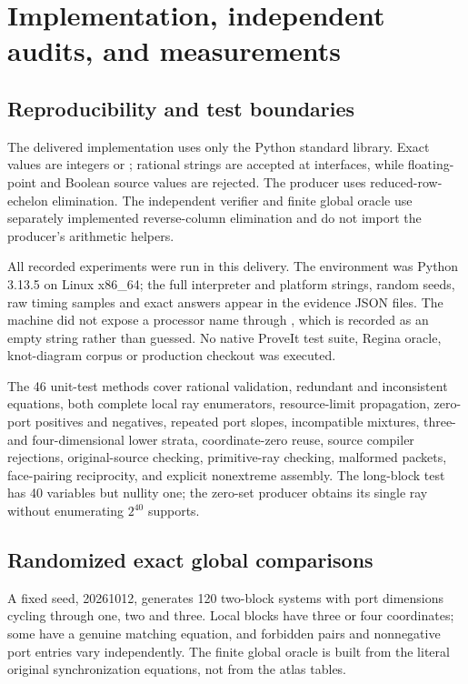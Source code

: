 \section{Implementation, independent audits, and measurements}
\label{sec:evidence}

\subsection{Reproducibility and test boundaries}
The delivered implementation uses only the Python standard library. Exact values are integers or ; rational strings are accepted at interfaces, while floating-point and Boolean source values are rejected. The producer uses reduced-row-echelon elimination. The independent verifier and finite global oracle use separately implemented reverse-column elimination and do not import the producer's arithmetic helpers.

All recorded experiments were run in this delivery. The environment was Python 3.13.5 on Linux x86\_64; the full interpreter and platform strings, random seeds, raw timing samples and exact answers appear in the evidence JSON files. The machine did not expose a processor name through , which is recorded as an empty string rather than guessed. No native ProveIt test suite, Regina oracle, knot-diagram corpus or production checkout was executed.

The 46 unit-test methods cover rational validation, redundant and inconsistent equations, both complete local ray enumerators, resource-limit propagation, zero-port positives and negatives, repeated port slopes, incompatible mixtures, three- and four-dimensional lower strata, coordinate-zero reuse, source compiler rejections, original-source checking, primitive-ray checking, malformed packets, face-pairing reciprocity, and explicit nonextreme assembly. The long-block test has 40 variables but nullity one; the zero-set producer obtains its single ray without enumerating $2^{40}$ supports.

\subsection{Randomized exact global comparisons}
A fixed seed, 20261012, generates 120 two-block systems with port dimensions cycling through one, two and three. Local blocks have three or four coordinates; some have a genuine matching equation, and forbidden pairs and nonnegative port entries vary independently. The finite global oracle is built from the literal original synchronization equations, not from the atlas tables.

